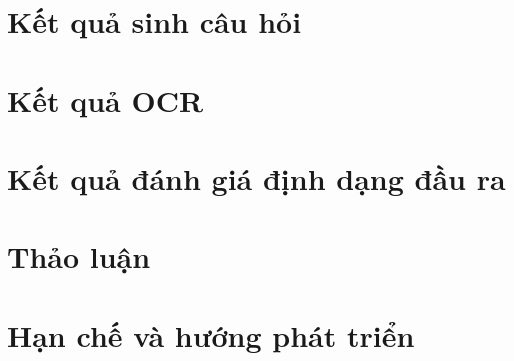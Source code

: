 \section{Kết quả sinh câu hỏi}

\section{Kết quả OCR}

\section{Kết quả đánh giá định dạng đầu ra}

\section{Thảo luận}

\section{Hạn chế và hướng phát triển}